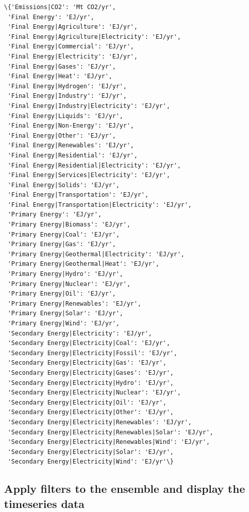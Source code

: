 \documentclass[11pt]{article}
\makeatletter
\newcommand{\boxspacing}{\kern\kvtcb@left@rule\kern\kvtcb@boxsep}
\newcommand{\prompt}[4]{
        {\ttfamily\llap{{\color{#2}[#3]:\hspace{3pt}#4}}\vspace{-\baselineskip}}
    }
\makeatother
\begin{document}
            \begin{tcolorbox}[breakable, size=fbox, boxrule=.5pt, pad at break*=1mm, opacityfill=0]
\prompt{Out}{outcolor}{9}{\boxspacing}
\begin{Verbatim}[commandchars=\\\{\}]
\{'Emissions|CO2': 'Mt CO2/yr',
 'Final Energy': 'EJ/yr',
 'Final Energy|Agriculture': 'EJ/yr',
 'Final Energy|Agriculture|Electricity': 'EJ/yr',
 'Final Energy|Commercial': 'EJ/yr',
 'Final Energy|Electricity': 'EJ/yr',
 'Final Energy|Gases': 'EJ/yr',
 'Final Energy|Heat': 'EJ/yr',
 'Final Energy|Hydrogen': 'EJ/yr',
 'Final Energy|Industry': 'EJ/yr',
 'Final Energy|Industry|Electricity': 'EJ/yr',
 'Final Energy|Liquids': 'EJ/yr',
 'Final Energy|Non-Energy': 'EJ/yr',
 'Final Energy|Other': 'EJ/yr',
 'Final Energy|Renewables': 'EJ/yr',
 'Final Energy|Residential': 'EJ/yr',
 'Final Energy|Residential|Electricity': 'EJ/yr',
 'Final Energy|Services|Electricity': 'EJ/yr',
 'Final Energy|Solids': 'EJ/yr',
 'Final Energy|Transportation': 'EJ/yr',
 'Final Energy|Transportation|Electricity': 'EJ/yr',
 'Primary Energy': 'EJ/yr',
 'Primary Energy|Biomass': 'EJ/yr',
 'Primary Energy|Coal': 'EJ/yr',
 'Primary Energy|Gas': 'EJ/yr',
 'Primary Energy|Geothermal|Electricity': 'EJ/yr',
 'Primary Energy|Geothermal|Heat': 'EJ/yr',
 'Primary Energy|Hydro': 'EJ/yr',
 'Primary Energy|Nuclear': 'EJ/yr',
 'Primary Energy|Oil': 'EJ/yr',
 'Primary Energy|Renewables': 'EJ/yr',
 'Primary Energy|Solar': 'EJ/yr',
 'Primary Energy|Wind': 'EJ/yr',
 'Secondary Energy|Electricity': 'EJ/yr',
 'Secondary Energy|Electricity|Coal': 'EJ/yr',
 'Secondary Energy|Electricity|Fossil': 'EJ/yr',
 'Secondary Energy|Electricity|Gas': 'EJ/yr',
 'Secondary Energy|Electricity|Gases': 'EJ/yr',
 'Secondary Energy|Electricity|Hydro': 'EJ/yr',
 'Secondary Energy|Electricity|Nuclear': 'EJ/yr',
 'Secondary Energy|Electricity|Oil': 'EJ/yr',
 'Secondary Energy|Electricity|Other': 'EJ/yr',
 'Secondary Energy|Electricity|Renewables': 'EJ/yr',
 'Secondary Energy|Electricity|Renewables|Solar': 'EJ/yr',
 'Secondary Energy|Electricity|Renewables|Wind': 'EJ/yr',
 'Secondary Energy|Electricity|Solar': 'EJ/yr',
 'Secondary Energy|Electricity|Wind': 'EJ/yr'\}
\end{Verbatim}
\end{tcolorbox}
        
    \hypertarget{apply-filters-to-the-ensemble-and-display-the-timeseries-data}{%
\subsection{Apply filters to the ensemble and display the timeseries
data}\label{apply-filters-to-the-ensemble-and-display-the-timeseries-data}}
\end{document}
